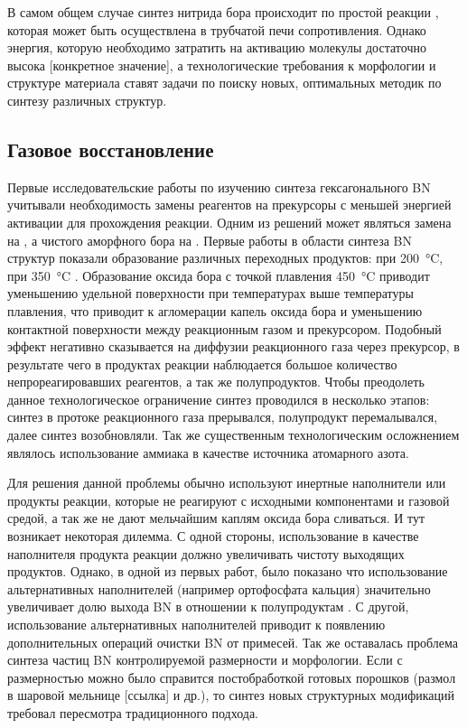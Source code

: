 В самом общем случае синтез нитрида бора происходит по простой реакции , 
которая может быть осуществлена в трубчатой печи сопротивления. Однако энергия, которую 
необходимо затратить на активацию молекулы  достаточно высока [конкретное
значение], а технологические требования к морфологии и структуре материала ставят
задачи по поиску новых, оптимальных методик по синтезу различных структур. 

\subsection{Газовое восстановление}%
\label{sub:Газовое востановление}

Первые исследовательские работы по изучению синтеза гексагонального BN учитывали
необходимость замены реагентов на прекурсоры с  меньшей энергией активации для 
прохождения реакции. Одним из решений может являться
замена  на , а чистого аморфного бора на . Первые
работы в области синтеза BN структур показали образование различных переходных 
продуктов:  при \SI{200}{\degreeCelsius},
 при \SI{350}{\degreeCelsius}
\cite[]{economy_boron_1967}. Образование оксида бора с точкой плавления
\SI{450}{\degreeCelsius} приводит уменьшению удельной поверхности при
температурах выше температуры плавления, что приводит к агломерации
капель оксида бора и уменьшению контактной поверхности между реакционным
газом и прекурсором. Подобный эффект негативно сказывается на диффузии реакционного
газа через прекурсор, в результате чего в продуктах реакции наблюдается большое 
количество непрореагировавших реагентов, а так же полупродуктов. Чтобы преодолеть
данное технологическое ограничение синтез проводился в несколько этапов: синтез
в протоке реакционного газа прерывался, полупродукт перемалывался, далее синтез
возобновляли. Так же существенным технологическим осложнением являлось 
использование аммиака в качестве источника атомарного азота.

Для решения данной проблемы обычно используют инертные наполнители или
продукты реакции, которые не реагируют с исходными компонентами и газовой
средой, а так же не дают мельчайшим каплям оксида бора сливаться. И тут
возникает некоторая дилемма. С одной стороны, использование в качестве
наполнителя продукта реакции должно увеличивать чистоту выходящих
продуктов. Однако, в одной из первых работ, было показано что
использование альтернативных наполнителей (например ортофосфата кальция)
значительно увеличивает долю выхода BN в отношении к полупродуктам
\cite[]{basu_synthesis_1990}. С другой, использование альтернативных
наполнителей приводит к появлению дополнительных операций очистки BN от
примесей. Так же оставалась проблема синтеза частиц BN контролируемой
размерности и морфологии. Если с размерностью можно было справится
постобработкой готовых порошков (размол в шаровой мельнице [ссылка]
и др.), то синтез новых структурных модификаций требовал пересмотра
традиционного подхода.

